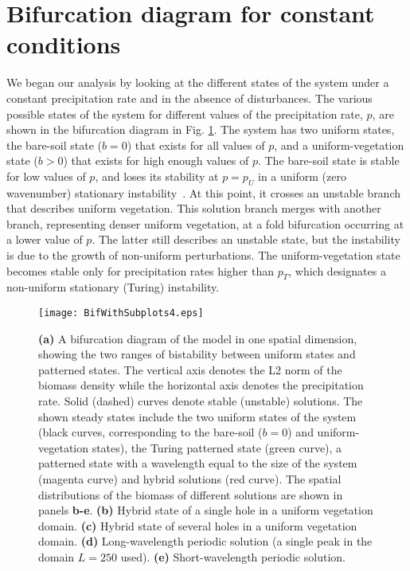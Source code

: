 \documentclass[aps,prl,preprint,superscriptaddress,floatfix]{revtex4-1}
\begin{document}
\section{Bifurcation diagram for constant conditions}
We began our analysis by looking at the different states of the system under a constant precipitation rate and in the absence of disturbances.
The various possible states of the system for different values of the precipitation rate, $p$, are shown in the bifurcation diagram in Fig. \ref{fig:BifGen}.
The system has two uniform states, the bare-soil state ($b=0$) that exists for all values of $p$, and a uniform-vegetation state ($b>0$) that exists for high enough values of $p$.
The bare-soil state is stable for low values of $p$, and loses its stability at $p=p_U$ in a uniform (zero wavenumber) stationary instability~\cite{Meron2015book}. 
At this point, it crosses an unstable branch that describes uniform vegetation. This solution branch merges with another branch, representing denser uniform vegetation, at a fold bifurcation occurring at a lower value of $p$. 
The latter still describes an unstable state, but the instability is due to the growth of non-uniform perturbations. 
The uniform-vegetation state becomes stable only for precipitation rates higher than $p_T$, which designates a non-uniform stationary (Turing) instability.

\begin{figure}
    \texttt{[image: BifWithSubplots4.eps]}
    \caption{\textbf{(a)} A bifurcation diagram of the model in one spatial dimension, showing the two ranges of bistability between uniform states and patterned states. 
  The vertical axis denotes the L2 norm of the biomass density while the horizontal axis denotes the precipitation rate. Solid (dashed) curves denote stable (unstable) solutions. 
  The shown steady states include the two uniform states of the system (black curves, corresponding to the bare-soil ($b=0$) and uniform-vegetation states), the Turing patterned state (green curve), 
  a patterned state with a wavelength equal to the size of the system (magenta curve) and hybrid solutions (red curve).
The spatial distributions of the biomass of different solutions are shown in panels \textbf{b-e}.
\textbf{(b)} Hybrid state of a single hole in a uniform vegetation domain.
\textbf{(c)} Hybrid state of several holes in a uniform vegetation domain.
\textbf{(d)} Long-wavelength periodic solution (a single peak in the domain $L=250$ used).
\textbf{(e)} Short-wavelength periodic solution. \label{fig:BifGen}}
\end{figure}
\end{document}
